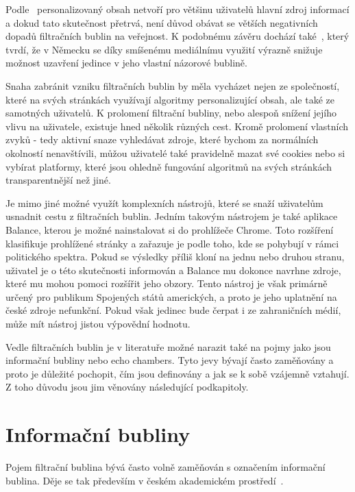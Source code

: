     Podle~\cite{ZuiderveenBorgesius2016Should} personalizovaný obsah netvoří pro většinu uživa\-telů hlavní zdroj informací a dokud tato skutečnost přetrvá, není důvod obávat se větších negativních dopadů filtračních bublin na veřejnost. K podobnému závěru dochází také~\cite{Krafft2017}, který tvrdí, že v Německu se díky smíšenému mediálnímu využití výrazně snižuje možnost uzavření jedince v jeho vlastní názorové bublině. 
    
    Snaha zabránit vzniku filtračních bublin by měla vycházet nejen ze společností, které na svých stránkách využívají algoritmy personalizující obsah, ale také ze samotných uživatelů. K prolomení filtrační bubliny, nebo alespoň snížení jejího vlivu na uživatele, existuje hned několik různých cest. Kromě prolomení vlastních zvyků - tedy aktivní snaze vyhledávat zdroje, které bychom za normál\-ních okolností nenavštívili, můžou uživatelé také pravidelně mazat své cookies nebo si vybírat platformy, které jsou ohledně fungování algoritmů na svých strán\-kách transparentnější než jiné.~\cite{Pariser2011}
    
    Je mimo jiné možné využít komplexních nástrojů, které se snaží uživatelům usnadnit cestu z filtračních bublin. Jedním takovým nástrojem je také aplikace Balance, kterou je možné nainstalovat si do prohlížeče Chrome. Toto rozšíření klasifikuje prohlížené stránky a zařazuje je podle toho, kde se pohybují v rámci politického spektra. Pokud se výsledky příliš kloní na jednu nebo druhou stranu, uživatel je o této skutečnosti informován a Balance mu dokonce navrhne zdroje, které mu mohou pomoci rozšířit jeho obzory. Tento nástroj je však primárně určený pro publikum Spojených států amerických, a proto je jeho uplatnění na české zdroje nefunkční. Pokud však jedinec bude čerpat i ze zahraničních médií, může mít nástroj jistou výpovědní hodnotu.~\citep{Munson13}
    
    Vedle filtračních bublin je v literatuře možné narazit také na pojmy jako jsou informační bubliny nebo echo chambers. Tyto jevy bývají často zaměňovány a proto je důležité pochopit, čím jsou definovány a jak se k sobě vzájemně vztahují. Z toho důvodu jsou jim věnovány následující podkapitoly.

\section{Informační bubliny}
\label{sec:informacni-bubliny}
    Pojem filtrační bublina bývá často volně zaměňován s označením informační bublina. Děje se tak především v českém akademickém prostředí~\citep{Mudrovamastersthesis,Rivamastersthesis, Valentovamastersthesis}.
    
